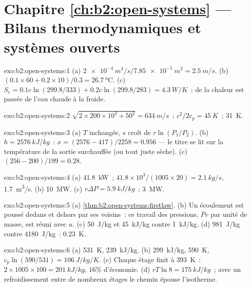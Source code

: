 \section*{Chapitre \ref{ch:b2:open-systems} --- Bilans thermodynamiques et systèmes ouverts}

\begin{solution}{exo:b2:open-systems:1}
(a) $\qty{2e-4}{m^3/s}/\qty{7.85e-5}{m^2} = \qty{2.5}{m/s}$. (b) $(0.1 \times 60 + 0.2
\times 10)/0.3 = \qty{26.7}{\celsius}$. (c) $\dot S_{\text{c}} = 0.1c\ln(299.8/333) +
0.2c\ln(299.8/283) = \qty{4.3}{W/K}$~: de la chaleur est passée de l'eau chaude à la froide.
\end{solution}

\begin{solution}{exo:b2:open-systems:2}
$\sqrt{2 \times 200 \times 10^3 + 50^2} = \qty{634}{m/s}$~; $c^2/2c_p = \qty{45}{K}$~;
\qty{31}{K}.
\end{solution}

\begin{solution}{exo:b2:open-systems:3}
(a) $T$ inchangée, $s$ croît de $r\ln(P_1/P_2)$. (b) $h = \qty{2576}{kJ/kg}$~:
$x = (2576 - 417)/2258 = 0.956$ --- le titre se lit sur la
température de la sortie surchauffée (ou tout juste sèche). (c) $(256 -
200)/199 = 0.28$.
\end{solution}

\begin{solution}{exo:b2:open-systems:4}
(a) \qty{41.8}{kW}~; $41.8 \times 10^3/(1005 \times 20) = \qty{2.1}{kg/s}$, \qty{1.7}{m^3/s}.
(b) \qty{10}{MW}. (c) $v\Delta P = \qty{5.9}{kJ/kg}$~; \qty{3}{MW}.
\end{solution}

\begin{solution}{exo:b2:open-systems:5}
(a) \cref{thm:b2:open-systems:firstlaw}. (b) Un écoulement est poussé dedans et
dehors par ses voisins~: ce travail des pressions, $Pv$ par unité de masse, est
réuni avec $u$. (c) \qty{50}{J/kg} et \qty{45}{kJ/kg} contre \qty{1}{kJ/kg}.
(d) \qty{981}{J/kg} contre \qty{4180}{J/kg}~: \qty{0.23}{K}.
\end{solution}

\begin{solution}{exo:b2:open-systems:6}
(a) \qty{531}{K}, \qty{239}{kJ/kg}. (b) \qty{299}{kJ/kg}, \qty{590}{K}, $c_p\ln(590/531)
= \qty{106}{J/kg/K}$. (c) Chaque étage finit à \qty{393}{K}~: $2 \times 1005 \times 100 =
\qty{201}{kJ/kg}$, $16\%$ d'économie. (d) $rT\ln 8 = \qty{175}{kJ/kg}$~; avec
un refroidissement entre de nombreux étages le chemin épouse l'isotherme.
\end{solution}

